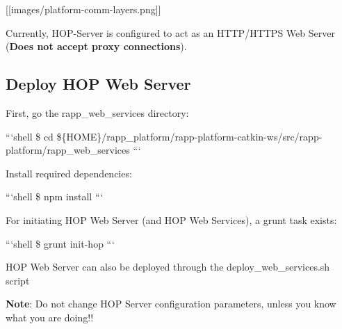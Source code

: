 \mbox{[}\mbox{[}images/platform-\/comm-\/layers.\-png\mbox{]}\mbox{]}

Currently, H\-O\-P-\/\-Server is configured to act as an H\-T\-T\-P/\-H\-T\-T\-P\-S Web Server ({\bfseries Does not accept proxy connections}).

\subsection*{Deploy H\-O\-P Web Server}

First, go the rapp\-\_\-web\-\_\-services directory\-:

```shell \$ cd \$\{H\-O\-M\-E\}/rapp\-\_\-platform/rapp-\/platform-\/catkin-\/ws/src/rapp-\/platform/rapp\-\_\-web\-\_\-services ```

Install required dependencies\-:

```shell \$ npm install ```

For initiating H\-O\-P Web Server (and H\-O\-P Web Services), a grunt task exists\-:

```shell \$ grunt init-\/hop ```

H\-O\-P Web Server can also be deployed through the deploy\-\_\-web\-\_\-services.\-sh script

{\bfseries Note}\-: Do not change H\-O\-P Server configuration parameters, unless you know what you are doing!! 